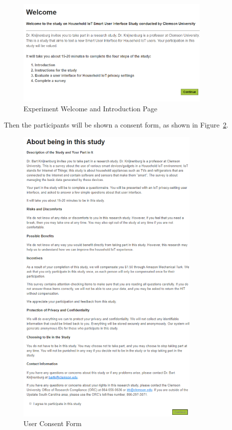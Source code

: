 \begin{figure}
	\centering
	\includegraphics[width=0.85\textwidth]{figures/userstudy1.png}
	\caption{Experiment Welcome and Introduction Page}
	\label{fig:us1}
\end{figure}

Then the participants will be shown a consent form, as shown in Figure~\ref{fig:us2}.
\begin{figure}
	\centering
	\includegraphics[width=0.8\textwidth]{figures/userstudy2.png}
	\caption{User Consent Form}
	\label{fig:us2}
\end{figure}

